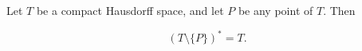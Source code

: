 Let $T$ be a compact Hausdorff space, and let $P$ be any point of $T$. Then

$$
(T \setminus \{P\})^{*} = T.
$$
